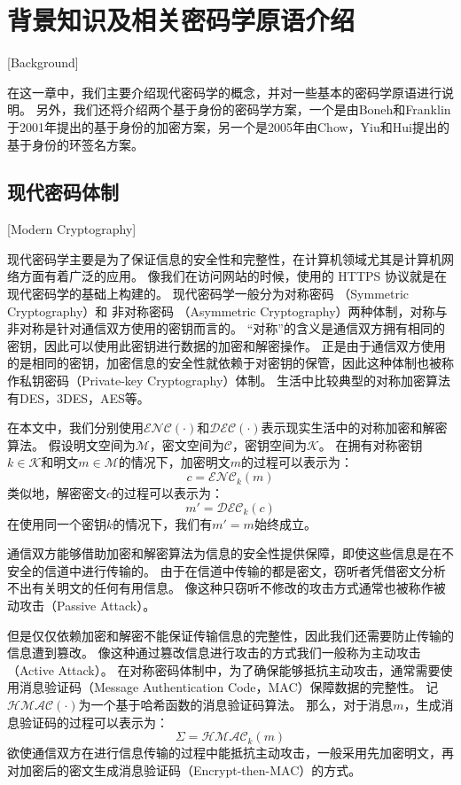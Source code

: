 

\chapter{背景知识及相关密码学原语介绍}[Background]

在这一章中，我们主要介绍现代密码学的概念，并对一些基本的密码学原语进行说明。
另外，我们还将介绍两个基于身份的密码学方案，一个是由Boneh和Franklin于2001年提出的基于身份的加密方案\cite{boneh2001identity}，另一个是2005年由Chow，Yiu和Hui提出的基于身份的环签名方案\cite{chow2005efficient}。

\section{现代密码体制}[Modern Cryptography]

现代密码学主要是为了保证信息的安全性和完整性，在计算机领域尤其是计算机网络方面有着广泛的应用。
像我们在访问网站的时候，使用的 HTTPS 协议就是在现代密码学的基础上构建的。
现代密码学一般分为对称密码 （Symmetric Cryptography）和 非对称密码 （Asymmetric Cryptography）两种体制，对称与非对称是针对通信双方使用的密钥而言的。
“对称”的含义是通信双方拥有相同的密钥，因此可以使用此密钥进行数据的加密和解密操作。
正是由于通信双方使用的是相同的密钥，加密信息的安全性就依赖于对密钥的保管，因此这种体制也被称作私钥密码（Private-key Cryptography）体制。
生活中比较典型的对称加密算法有DES，3DES，AES等。

在本文中，我们分别使用$\mathcal{ENC}(\cdot)$和$\mathcal{DEC}(\cdot)$表示现实生活中的对称加密和解密算法。
假设明文空间为$\mathcal{M}$，密文空间为$\mathcal{C}$，密钥空间为$\mathcal{K}$。
在拥有对称密钥$k\in\mathcal{K}$和明文$m\in\mathcal{M}$的情况下，加密明文$m$的过程可以表示为：
\begin{equation}
c=\mathcal{ENC}_k(m)
\end{equation}
类似地，解密密文$c$的过程可以表示为：
\begin{equation}
m'=\mathcal{DEC}_k(c)
\end{equation}
在使用同一个密钥$k$的情况下，我们有$m'=m$始终成立。

通信双方能够借助加密和解密算法为信息的安全性提供保障，即使这些信息是在不安全的信道中进行传输的。
由于在信道中传输的都是密文，窃听者凭借密文分析不出有关明文的任何有用信息。
像这种只窃听不修改的攻击方式通常也被称作被动攻击（Passive Attack）。

但是仅仅依赖加密和解密不能保证传输信息的完整性，因此我们还需要防止传输的信息遭到篡改。
像这种通过篡改信息进行攻击的方式我们一般称为主动攻击（Active Attack）。
在对称密码体制中，为了确保能够抵抗主动攻击，通常需要使用消息验证码（Message Authentication Code，MAC）保障数据的完整性。
记$\mathcal{HMAC}(\cdot)$为一个基于哈希函数的消息验证码算法。
那么，对于消息$m$，生成消息验证码的过程可以表示为：
\begin{equation}
\Sigma=\mathcal{HMAC}_k(m)
\end{equation}
欲使通信双方在进行信息传输的过程中能抵抗主动攻击，一般采用先加密明文，再对加密后的密文生成消息验证码（Encrypt-then-MAC）\cite{krawczyk2001order}的方式。

